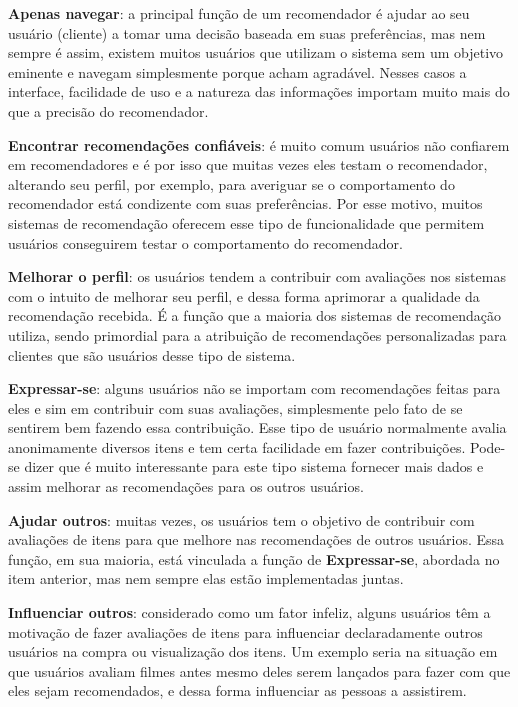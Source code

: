 \textbf{Apenas navegar}: a principal função de um recomendador é ajudar ao seu usuário (cliente) a tomar uma decisão baseada em suas preferências, mas nem sempre é assim, existem muitos usuários que utilizam o sistema sem um objetivo eminente e navegam simplesmente porque acham agradável. Nesses casos a interface, facilidade de uso e a natureza das informações importam muito mais do que a precisão do recomendador.

\textbf{Encontrar recomendações confiáveis}: é muito comum usuários não confiarem em recomendadores e é por isso que muitas vezes eles testam o recomendador, alterando seu perfil, por exemplo, para averiguar se o comportamento do recomendador está condizente com suas preferências. Por esse motivo, muitos sistemas de recomendação oferecem esse tipo de funcionalidade que permitem usuários conseguirem testar o comportamento do recomendador.

\textbf{Melhorar o perfil}: os usuários tendem a contribuir com avaliações nos sistemas com o intuito de melhorar seu perfil, e dessa forma aprimorar a qualidade da recomendação recebida. É a função que a maioria dos sistemas de recomendação utiliza, sendo primordial para a atribuição de recomendações personalizadas para clientes que são usuários desse tipo de sistema.

\textbf{Expressar-se}: alguns usuários não se importam com recomendações feitas para eles e sim em contribuir com suas avaliações, simplesmente pelo fato de se sentirem bem fazendo essa contribuição. Esse tipo de usuário normalmente avalia anonimamente diversos itens e tem certa facilidade em fazer contribuições. Pode-se dizer que é muito interessante para este tipo sistema fornecer mais dados e assim melhorar as recomendações para os outros usuários.

\textbf{Ajudar outros}: muitas vezes, os usuários tem o objetivo de contribuir com avaliações de itens para que melhore nas recomendações de outros usuários. Essa função, em sua maioria, está vinculada a função de \textbf{Expressar-se}, abordada no item anterior, mas nem sempre elas estão implementadas juntas.

\textbf{Influenciar outros}: considerado como um fator infeliz, alguns usuários têm a motivação de fazer avaliações de itens para influenciar declaradamente outros usuários na compra ou visualização dos itens. Um exemplo seria na situação em que usuários avaliam filmes antes mesmo deles serem lançados para fazer com que eles sejam recomendados,  e dessa forma influenciar as pessoas a assistirem.

